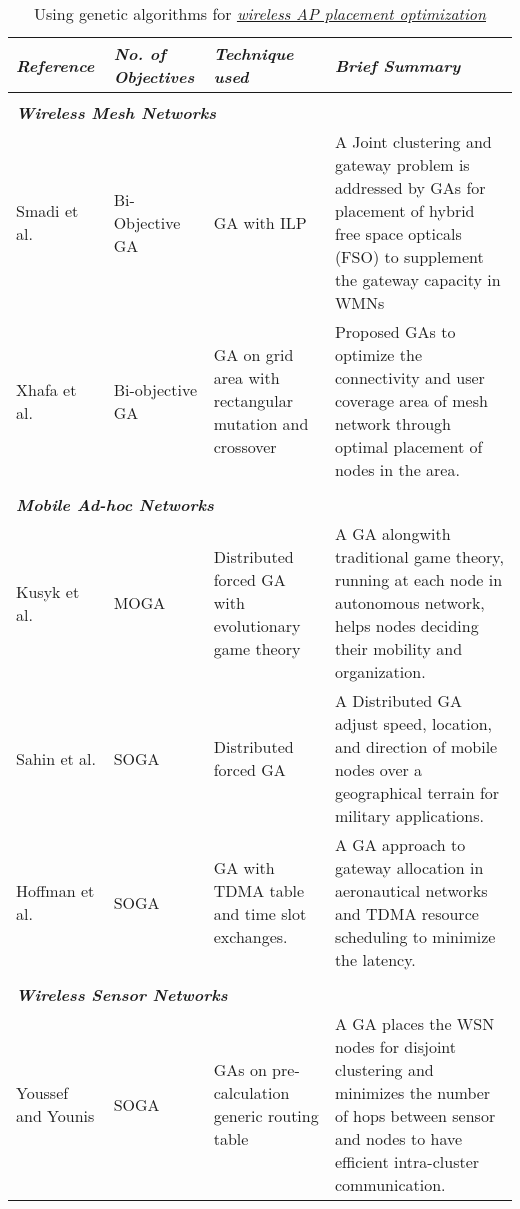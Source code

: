 \documentclass[journal]{IEEEtran}
\begin{document}
\begin{table*}
\caption{Using genetic algorithms for \textit{\underline{wireless AP placement optimization}}}
\centering
\begin{tabular}{p{1.8cm}  p{1.8cm} p{4cm} p{9.3cm}}
\toprule
\textbf{\emph{Reference}}  &   \textbf{\emph{No. of Objectives}}  &  \textbf{\emph{Technique used}} & \textbf{\emph{Brief Summary}} \\
\midrule

\\
\multicolumn{3}{l}{\textbf{\emph{Wireless Mesh Networks}}} \\
Smadi et al. \cite{smadi2009free}   & Bi-Objective GA & GA with ILP &  A Joint clustering and gateway problem is addressed by GAs for placement of hybrid free space opticals (FSO) to supplement the gateway capacity in WMNs\\

Xhafa et al.\cite{xhafa2010genetic}  & Bi-objective GA & GA on grid area with rectangular mutation and crossover &  Proposed GAs to optimize the connectivity and user coverage area of mesh network through optimal placement of nodes in the area.\\

\\
\multicolumn{3}{l}{\textbf{\emph{Mobile Ad-hoc Networks}}} \\
Kusyk et al. \cite{kusyk2011self}  & MOGA & Distributed forced GA with evolutionary game theory &  A GA alongwith traditional game theory, running at each node in autonomous network, helps nodes deciding their mobility and organization.\\

Sahin et al. \cite{sahin2008uniform}  & SOGA &  Distributed forced GA &  A Distributed GA adjust speed, location, and direction of mobile nodes over a geographical terrain for military applications.\\

Hoffman et al. \cite{hoffmann2011optimization}  &  SOGA & GA with TDMA table and time slot exchanges.  &  A GA approach to gateway allocation in aeronautical networks and TDMA resource scheduling to minimize the latency.\\

\\
\multicolumn{3}{l}{\textbf{\emph{Wireless Sensor Networks}}} \\
Youssef and Younis \cite{youssef2007intelligent}  & SOGA & GAs on pre-calculation generic routing table  &  A GA places the WSN nodes for disjoint clustering and minimizes the number of hops between sensor and nodes to have efficient intra-cluster communication. \\


\end{tabular}
\end{table*}
\end{document}
